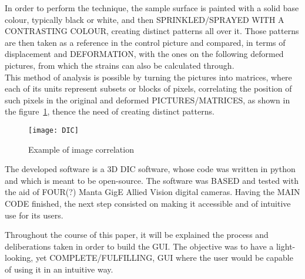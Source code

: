 In order to perform the technique, the sample surface is painted with a solid base colour, typically black or white, and then SPRINKLED/SPRAYED WITH A CONTRASTING COLOUR, creating distinct patterns all over it. Those patterns are then taken as a reference in the control picture and compared, in terms of displacement and DEFORMATION, with the ones on the following deformed pictures, from which the strains can also be calculated through.\\

This method of analysis is possible by turning the pictures into matrices, where each of its units represent subsets or blocks of pixels, correlating the position of such pixels in the original and deformed PICTURES/MATRICES, as shown in the figure~\ref{fig:dic}, thence the need of creating distinct patterns.\\

\begin{figure}[h!]
	\centering
	\texttt{[image: DIC]}
	\caption{Example of image correlation}
	\label{fig:dic}
\end{figure}

The developed software is a 3D DIC software, whose code was written in python and which is meant to be open-source. The software was BASED and tested with the aid of FOUR(?) Manta GigE Allied Vision digital cameras. %
Having the MAIN CODE finished, the next step consisted on making it accessible and of intuitive use for its users.

Throughout the course of this paper, it will be explained the process and deliberations taken in order to build the GUI. The objective was to have a light-looking, yet COMPLETE/FULFILLING, GUI where the user would be capable of using it in an intuitive way.








